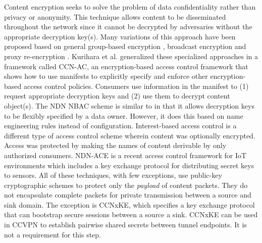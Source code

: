 Content encryption seeks to solve the problem of data confidentiality rather than
privacy or anonymity. This technique allows content to be disseminated throughout
the network since it cannot be decrypted by adversaries without the appropriate decryption key(s).
Many variations of this approach have been proposed based on general
group-based encryption \cite{Smetters2010}, broadcast encryption \cite{Misra2013,Ion2013} and
proxy re-encryption \cite{Wood2014}. Kurihara et al. \cite{ifip15} generalized these specialized
approaches in a framework called CCN-AC, an encryption-based access control framework
that shows how to use manifests to explicitly specify and enforce other encryption-based
access control policies. Consumers use information in the manifest to (1) request appropriate
decryption keys and (2) use them to decrypt content object(s). The NDN NBAC \cite{yu2015name}
scheme is similar to \cite{ifip15} in that it allows decryption keys to be
flexibly specified by a data owner. However, it does this based on name engineering rules instead of
configuration. Interest-based access control \cite{ghali2015interest} is a different
type of access control scheme wherein content was optionally encrypted. Access
was protected by making the names of content derivable by only authorized consumers.
NDN-ACE \cite{shangndn} is a recent access control framework for IoT environments
which includes a key exchange protocol for distributing secret keys to sensors.
All of these techniques, with few exceptions, use public-key cryptographic schemes
to protect only the \emph{payload} of content packets. They do not encapsulate complete
packets for private transmission between a source and sink domain. The exception is CCNxKE\cite{ccnxke}, 
which specifies a key exchange protocol that can bootstrap secure sessions between a source
a sink. CCNxKE can be used in CCVPN to establish pairwise shared secrets between tunnel
endpoints. It is not a requirement for this step.
